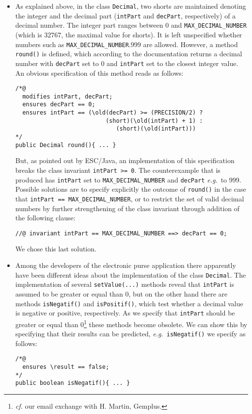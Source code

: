 \documentclass[a4paper]{llncs}
\begin{document}
\begin{itemize}
\item As explained above, in the class \texttt{Decimal}, two shorts
are maintained denoting the integer and the decimal part
(\texttt{intPart} and \texttt{decPart}, respectively) of a decimal
number. The integer part ranges between 0 and
\texttt{MAX\_DECIMAL\_NUMBER} (which is 32767, the maximal value for
shorts). It is left unspecified whether numbers such as
\texttt{MAX\_DECIMAL\_NUMBER}.999 are allowed. However, 
a method \texttt{round()} is defined, which
according to the documentation returns a decimal number with
\texttt{decPart} set to 0 and \texttt{intPart} set to the closest
integer value. An obvious specification of this method reads as
follows:
\begin{verbatim}
/*@ 
  modifies intPart, decPart;
  ensures decPart == 0;
  ensures intPart == (\old(decPart) >= (PRECISION/2) ?
                          (short)(\old(intPart) + 1) :
                             (short)(\old(intPart)))
*/
public Decimal round(){ ... }
\end{verbatim}
But, as pointed out by ESC/Java, an implementation of this
specification breaks the class invariant \texttt{intPart >= 0}. The
counterexample that is produced has
\texttt{intPart} set to \texttt{MAX\_DECIMAL\_NUMBER} and
\texttt{decPart} \emph{e.g.}~to 999. Possible solutions are to
specify explicitly the outcome of \texttt{round()} in the case that
\texttt{intPart == MAX\_DECIMAL\_NUMBER}, or to restrict the set of
valid decimal numbers by further strengthening of the class invariant
through addition of the following clause:
\begin{verbatim}
//@ invariant intPart == MAX_DECIMAL_NUMBER ==> decPart == 0;
\end{verbatim}
We chose this last solution. 

\item Among the developers of the electronic purse application there
apparently have been different ideas about the implementation of the
class \texttt{Decimal}. The implementation of several
\texttt{setValue(...)} methods
reveal that \texttt{intPart} is assumed to be greater or equal than
0, but on the other hand there are methods
\texttt{isNegatif()} and \texttt{isPositif()}, which test whether a
decimal value is negative or positive, respectively. As we specify
that \texttt{intPart} should be greater or equal than
0\footnote{\emph{cf.} our email exchange with H. Martin, Gemplus.}
these methods become obsolete. We can show this by specifying
that their results can be predicted, \emph{e.g.}~\texttt{isNegatif()} we 
specify as follows:
\begin{verbatim}
/*@ 
  ensures \result == false;
*/
public boolean isNegatif(){ ... }
\end{verbatim}



\end{itemize}
\end{document}
